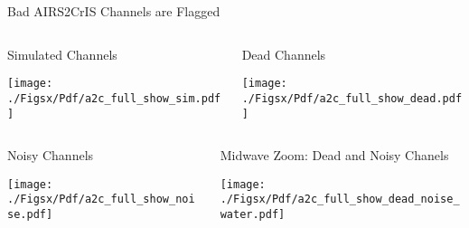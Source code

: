 \documentclass[10pt,t]{beamer}
\begin{document}
\begin{frame}[label={sec:orga947567}]{Bad AIRS2CrIS Channels are Flagged}
\vspace{-0.35in}
\begin{columns}
\begin{column}{0.55\columnwidth}
\begin{block}{\footnotesize Simulated Channels}
\vspace{-0.05in}
\vspace{-0.05in}
\begin{center}
\texttt{[image: ./Figsx/Pdf/a2c\_full\_show\_sim.pdf]}
\end{center}
\end{block}
\end{column}

\begin{column}{0.55\columnwidth}
\begin{block}{\footnotesize Dead Channels}
\vspace{-0.05in}
\vspace{-0.05in}
\begin{center}
\texttt{[image: ./Figsx/Pdf/a2c\_full\_show\_dead.pdf]}
\end{center}
\end{block}
\end{column}
\end{columns}

\vspace{-0.25in}

\begin{columns}
\begin{column}{0.55\columnwidth}
\begin{block}{\footnotesize Noisy Channels}
\vspace{-0.05in}
\vspace{-0.05in}
\begin{center}
\texttt{[image: ./Figsx/Pdf/a2c\_full\_show\_noise.pdf]}
\end{center}
\end{block}
\end{column}

\begin{column}{0.55\columnwidth}
\begin{block}{\footnotesize Midwave Zoom: Dead and Noisy Chanels}
\vspace{-0.05in}
\vspace{-0.05in}
\begin{center}
\texttt{[image: ./Figsx/Pdf/a2c\_full\_show\_dead\_noise\_water.pdf]}
\end{center}
\end{block}
\end{column}
\end{columns}
\end{frame}
\end{document}
